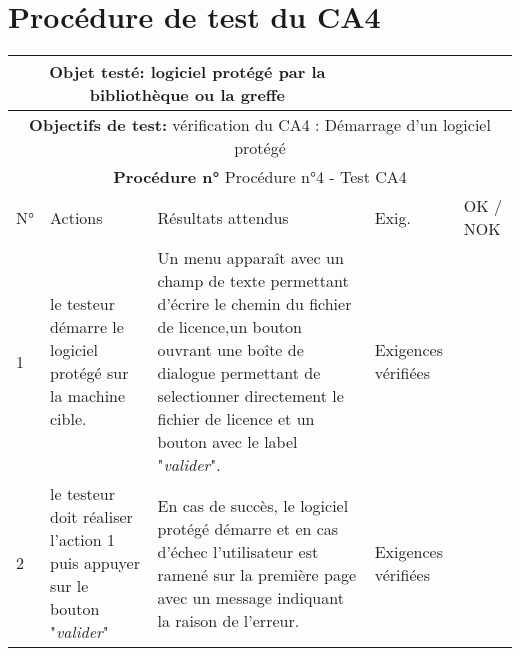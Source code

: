 \section{Procédure de test du CA4}
\begin{table}[!h]
        \centering
        \begin{tabular}{|m{0.6cm}|
                         >{\raggedright\arraybackslash}m{4cm}|
                         >{\raggedright\arraybackslash}m{6.4cm}|
                         >{\raggedright\arraybackslash}m{2cm}|
                         m{1cm}|}
            \hline
            \multicolumn{3}{|c|}{
                \textbf{Objet testé: } logiciel protégé par la bibliothèque ou la greffe
            } & \multicolumn{2}{|c|}{
                \textbf{Version: } version    
            } \\
            \hline
            \multicolumn{5}{|c|}{\textbf{Objectifs de test:}
                vérification du CA4 : Démarrage d'un logiciel protégé} \\
            \hline
            \multicolumn{5}{|c|}{
                \textbf{Procédure n° }Procédure n°4 - Test CA4 
            } \\
            \hline
            N° & Actions & Résultats attendus & Exig. & OK / NOK \\
            \hline      %
            1 & le testeur démarre le logiciel protégé sur la machine
                cible. 
              & Un menu apparaît avec un champ de texte permettant d'écrire
                le chemin du fichier de licence,un bouton ouvrant une 
                boîte de dialogue permettant de selectionner directement 
                le fichier de licence et un bouton avec le label "\emph{valider}". 
              & Exigences vérifiées & \\
            \hline
            2 & le testeur doit réaliser l'action 1 puis appuyer sur le bouton
                "\emph{valider}"
              & En cas de succès, le logiciel protégé démarre et en cas d'échec
                l'utilisateur est ramené sur la première page avec un message 
                indiquant la raison de l'erreur. 
              & Exigences vérifiées & \\
            \hline
        \end{tabular} 
        \label{tab:tab4}
\end{table}
\newpage

